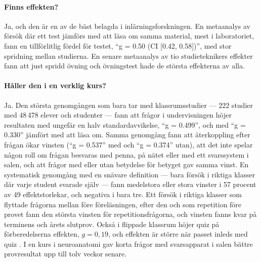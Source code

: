 \paragraph{Finns effekten?}
Ja, och den är en av de bäst belagda i inlärningsforskningen.  En
metaanalys av försök där ett test jämförs med att läsa om samma
material, mest i laboratoriet, fann en tillförlitlig fördel för testet,
\enquote{g = 0.50 (CI [0.42, 0.58])}, med stor spridning mellan
studierna\autocite{Rowland2014Testing}.  En senare metaanalys av tio
studieteknikers effekter fann att just spridd övning och övningstest
hade de största effekterna av alla\autocite{DonoghueHattie2021}.

\paragraph{Håller den i en verklig kurs?}
Ja.  Den största genomgången som bara tar med klassrumsstudier --- 222
studier med 48\,478 elever och studenter --- fann att frågor i
undervisningen höjer resultaten med ungefär en halv standardavvikelse,
\enquote{g = 0.499}, och med \enquote{g = 0.330} jämfört med att läsa
om\autocite{Yang2021Testing}.  Samma genomgång fann att återkoppling
efter frågan ökar vinsten (\enquote{g = 0.537} med och \enquote{g =
0.374} utan), att det inte spelar någon roll om frågan besvaras med
penna, på nätet eller med ett svarssystem i salen, och att frågor med
eller utan betydelse för betyget gav samma vinst\autocite{Yang2021Testing}.
En systematisk genomgång med en snävare definition --- bara försök i
riktiga klasser där varje student svarade själv --- fann medelstora
eller stora vinster i 57 procent av 49 effektstorlekar, och negativa i
bara tre\autocite{Agarwal2021Retrieval}.  Ett försök i riktiga klasser
som flyttade frågorna mellan före föreläsningen, efter den och som
repetition före provet fann den största vinsten för repetitionsfrågorna,
och vinsten fanns kvar på terminens och årets
slutprov\autocite{McDaniel2011Quiz}.
Också i flippade klassrum höjer quiz på förberedelserna effekten,
\(g = 0{,}19\)\autocite[9]{vanAlten2019}, och effekten är större när
passet inleds med quiz\autocite{HewLo2018}%
.
I en kurs i neuroanatomi gav korta frågor med svarsapparat i salen
bättre provresultat upp till tolv veckor senare\autocite{Pan2019Jargon}.

